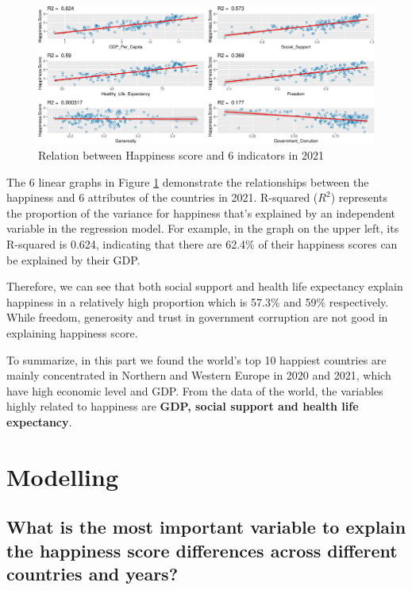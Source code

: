 \documentclass[11pt,a4paper,]{article}
\begin{document}
\begin{figure}
\centering
\includegraphics{Assignment4_files/figure-latex/relation-1.pdf}
\caption{\label{fig:relation}Relation between Happiness score and 6 indicators in 2021}
\end{figure}

The 6 linear graphs in Figure \ref{fig:relation} demonstrate the relationships between the happiness and 6 attributes of the countries in 2021. R-squared (\(R^2\)) represents the proportion of the variance for happiness that's explained by an independent variable in the regression model. For example, in the graph on the upper left, its R-squared is 0.624, indicating that there are 62.4\% of their happiness scores can be explained by their GDP.

Therefore, we can see that both social support and health life expectancy explain happiness in a relatively high proportion which is 57.3\% and 59\% respectively. While freedom, generosity and trust in government corruption are not good in explaining happiness score.

To summarize, in this part we found the world's top 10 happiest countries are mainly concentrated in Northern and Western Europe in 2020 and 2021, which have high economic level and GDP. From the data of the world, the variables highly related to happiness are \textbf{GDP, social support and health life expectancy}.

\clearpage

\hypertarget{modelling}{%
\section{Modelling}\label{modelling}}

\hypertarget{what-is-the-most-important-variable-to-explain-the-happiness-score-differences-across-different-countries-and-years}{%
\subsection{What is the most important variable to explain the happiness score differences across different countries and years?}\label{what-is-the-most-important-variable-to-explain-the-happiness-score-differences-across-different-countries-and-years}}
\end{document}

